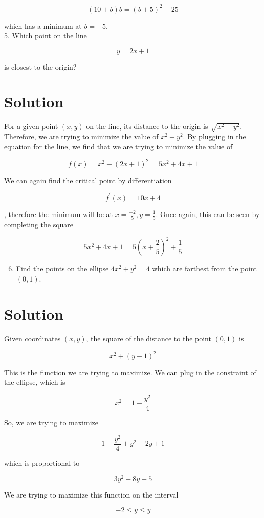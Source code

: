 \documentclass[10pt]{article}
\begin{document}
$$
(10+b) b=(b+5)^{2}-25
$$

which has a minimum at $b=-5$.\\
5. Which point on the line

$$
y=2 x+1
$$

is closest to the origin?

\section*{Solution}
For a given point $(x, y)$ on the line, its distance to the origin is $\sqrt{x^{2}+y^{2}}$. Therefore, we are trying to minimize the value of $x^{2}+y^{2}$. By plugging in the equation for the line, we find that we are trying to minimize the value of

$$
f(x)=x^{2}+(2 x+1)^{2}=5 x^{2}+4 x+1
$$

We can again find the critical point by differentiation

$$
f^{\prime}(x)=10 x+4
$$

, therefore the minimum will be at $x=\frac{-2}{5}, y=\frac{1}{5}$. Once again, this can be seen by completing the square

$$
5 x^{2}+4 x+1=5\left(x+\frac{2}{5}\right)^{2}+\frac{1}{5}
$$

\begin{enumerate}
  \setcounter{enumi}{5}
  \item Find the points on the ellipse $4 x^{2}+y^{2}=4$ which are farthest from the point $(0,1)$.
\end{enumerate}

\section*{Solution}
Given coordinates $(x, y)$, the square of the distance to the point $(0,1)$ is

$$
x^{2}+(y-1)^{2}
$$

This is the function we are trying to maximize. We can plug in the constraint of the ellipse, which is

$$
x^{2}=1-\frac{y^{2}}{4}
$$

So, we are trying to maximize

$$
1-\frac{y^{2}}{4}+y^{2}-2 y+1
$$

which is proportional to

$$
3 y^{2}-8 y+5
$$

We are trying to maximize this function on the interval

$$
-2 \leq y \leq y
$$
\end{document}
